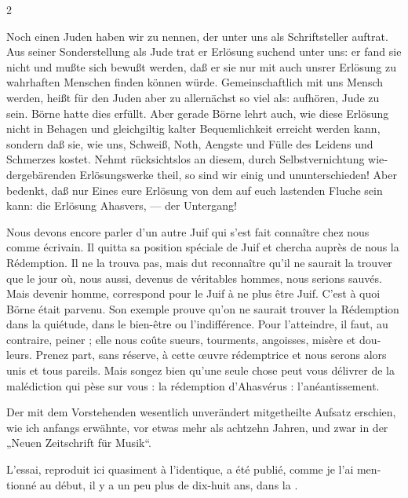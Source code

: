 \documentclass[a4paper,12pt]{article}
\newcommand\chunks[2]{%
\begin{leftcolumn*}\begin{otherlanguage}{german}%
{#1}%
\end{otherlanguage}\end{leftcolumn*}%
\begin{rightcolumn}\begin{otherlanguage}{french}%
{#2}%
\end{otherlanguage}\end{rightcolumn}%
}
\newcommand{\ornamentbreak}{%
  \begin{center}
    \psvectorian[width=2em]{2}\quad\psvectorian[width=2em,mirror]{2}%
  \end{center}%
}
\begin{document}
\begin{paracol}{2}
  \chunks{Noch einen Juden haben wir zu nennen, der unter uns als Schriftsteller auftrat. Aus seiner Sonderstellung als Jude trat er Erlösung suchend unter uns: er fand sie nicht und mußte sich bewußt werden, daß er sie nur mit auch unsrer Erlösung zu wahrhaften Menschen finden können würde. Gemeinschaftlich mit uns Mensch werden, heißt für den Juden aber zu allernächst so viel als: aufhören, Jude zu sein. Börne hatte dies erfüllt. Aber gerade Börne lehrt auch, wie diese Erlösung nicht in Behagen und gleichgiltig kalter Bequemlichkeit erreicht werden kann, sondern daß sie, wie uns, Schweiß, Noth, Aengste und Fülle des Leidens und Schmerzes kostet. Nehmt rücksichtslos an diesem, durch Selbstvernichtung wiedergebärenden Erlösungswerke theil, so sind wir einig und ununterschieden! Aber bedenkt, daß nur Eines eure Erlösung von dem auf euch lastenden Fluche sein kann: die Erlösung Ahasvers, --- der Untergang!\ornamentbreak}
         {Nous devons encore parler d’un autre Juif qui s’est fait connaître chez nous comme écrivain. Il quitta sa position spéciale de Juif et chercha auprès de nous la Rédemption. Il ne la trouva pas, mais dut reconnaître qu’il ne saurait la trouver que le jour où, nous aussi, devenus de véritables hommes, nous serions sauvés. Mais devenir homme, correspond pour le Juif à ne plus être Juif. C’est à quoi Börne était parvenu. Son exemple prouve qu’on ne saurait trouver la Rédemption dans la quiétude, dans le bien-être ou l’indifférence. Pour l’atteindre, il faut, au contraire, peiner ; elle nous coûte sueurs, tourments, angoisses, misère et douleurs. Prenez part, sans réserve, à cette œuvre rédemptrice et nous serons alors unis et tous pareils. Mais songez bien qu’une seule chose peut vous délivrer de la malédiction qui pèse sur vous : la rédemption d’Ahasvérus : l’anéantissement.}
  \chunks{Der mit dem Vorstehenden wesentlich unverändert mitgetheilte Aufsatz erschien, wie ich anfangs erwähnte, vor etwas mehr als achtzehn Jahren, und zwar in der „Neuen Zeitschrift für Musik“.}
         {L’essai, reproduit ici quasiment à l’identique, a été publié, comme je l’ai mentionné au début, il y a un peu plus de dix-huit ans, dans la \frquote{Neue Zeitschrift für Musik}.}

\end{paracol}
\end{document}
